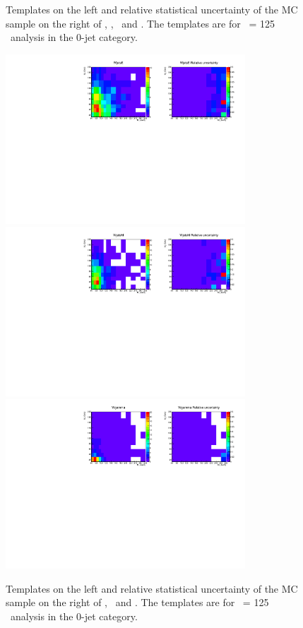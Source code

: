 \begin{figure}[htp]
\caption{Templates on the left and relative statistical uncertainty of the MC sample
on the right of \qqww, \ggww, \topbkg\ and \vv. 
The templates are for \mHi\ = 125 \GeV\ analysis in the 0-jet category.}
\label{fig:2dtemplate_125_0j_2}
\end{figure}

\begin{figure}[htp]
\centering
\includegraphics[width=0.8\textwidth]{figures/2dtemplate_WjetsE_mH125_0j.pdf}
\includegraphics[width=0.8\textwidth]{figures/2dtemplate_WjetsM_mH125_0j.pdf}
\includegraphics[width=0.8\textwidth]{figures/2dtemplate_Wgamma_mH125_0j.pdf}
\caption{Templates on the left and relative statistical uncertainty of the MC sample
on the right of \WjetsE, \WjetsM\ and \wgamma. 
The templates are for \mHi\ = 125 \GeV\ analysis in the 0-jet category.}
\label{fig:2dtemplate_125_0j_3}
\end{figure}

